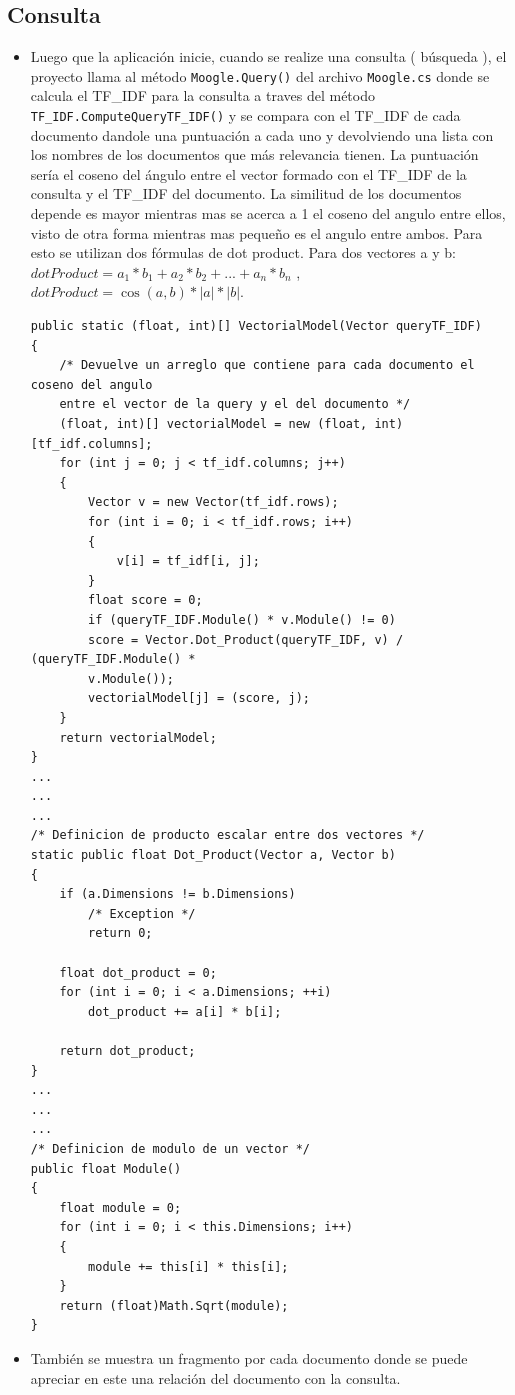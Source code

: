 \documentclass[12pt, a4paper]{article}
\begin{document}
\subsection*{Consulta}

\begin{itemize}
    \item Luego que la aplicación inicie, cuando se realize una consulta ( búsqueda ), el proyecto llama al método
    \texttt{Moogle.Query()} del archivo \texttt{Moogle.cs} donde se calcula el TF\_IDF para la consulta a traves del
    método \texttt{TF\_IDF.ComputeQueryTF\_IDF()} y se compara con el TF\_IDF de cada documento dandole
    una puntuación a cada uno y devolviendo una lista con los nombres de los documentos que más
    relevancia tienen. La puntuación sería el coseno del ángulo entre el vector formado con el TF\_IDF de la
    consulta y el TF\_IDF del documento. La similitud de los documentos depende es mayor mientras mas
    se acerca a 1 el coseno del angulo entre ellos, visto de otra forma mientras mas pequeño es el angulo
    entre ambos. Para esto se utilizan dos fórmulas de dot product. Para dos vectores a y b: $dotProduct
    = a_1 * b_1 + a_2 * b_2 + ... + a_n* b_n$ , $dotProduct = \cos(a,b) * |a|*|b|$.

\begin{lstlisting}
public static (float, int)[] VectorialModel(Vector queryTF_IDF)
{
    /* Devuelve un arreglo que contiene para cada documento el coseno del angulo
    entre el vector de la query y el del documento */
    (float, int)[] vectorialModel = new (float, int)[tf_idf.columns];
    for (int j = 0; j < tf_idf.columns; j++)
    {
        Vector v = new Vector(tf_idf.rows);
        for (int i = 0; i < tf_idf.rows; i++)
        {
            v[i] = tf_idf[i, j];
        }
        float score = 0;
        if (queryTF_IDF.Module() * v.Module() != 0)
        score = Vector.Dot_Product(queryTF_IDF, v) / (queryTF_IDF.Module() *
        v.Module());
        vectorialModel[j] = (score, j);
    }
    return vectorialModel;
}
...
...
...
/* Definicion de producto escalar entre dos vectores */
static public float Dot_Product(Vector a, Vector b)
{
    if (a.Dimensions != b.Dimensions)
        /* Exception */
        return 0;
    
    float dot_product = 0;
    for (int i = 0; i < a.Dimensions; ++i)
        dot_product += a[i] * b[i];
    
    return dot_product;
}
...
...
...
/* Definicion de modulo de un vector */
public float Module()
{
    float module = 0;
    for (int i = 0; i < this.Dimensions; i++)
    {
        module += this[i] * this[i];
    }
    return (float)Math.Sqrt(module);
}
\end{lstlisting}

\item También se muestra un fragmento por cada documento donde se puede apreciar en este una relación
del documento con la consulta.

\end{itemize}
\end{document}
